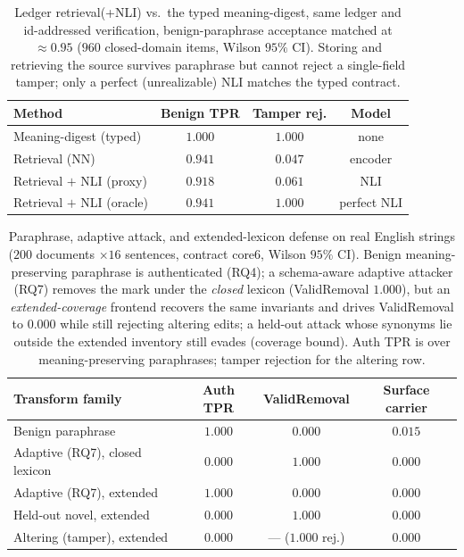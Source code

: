 \documentclass[journal]{IEEEtran}
\begin{document}
\begin{table}[t]
\centering
\caption{Ledger retrieval(+NLI) vs.\ the typed meaning-digest, same ledger and
id-addressed verification, benign-paraphrase acceptance matched at $\approx0.95$
($960$ closed-domain items, Wilson $95\%$ CI). Storing and retrieving the source
survives paraphrase but cannot reject a single-field tamper; only a perfect
(unrealizable) NLI matches the typed contract.}
\label{tab:retrieval}
\footnotesize
\begin{tabular}{lccc}
\toprule
Method & Benign TPR & Tamper rej. & Model \\
\midrule
Meaning-digest (typed)      & $1.000$ & $1.000$ & none \\
Retrieval (NN)              & $0.941$ & $0.047$ & encoder \\
Retrieval $+$ NLI (proxy)   & $0.918$ & $0.061$ & NLI \\
Retrieval $+$ NLI (oracle)  & $0.941$ & $1.000$ & perfect NLI \\
\bottomrule
\end{tabular}
\end{table}

\begin{table}[t]
\centering
\caption{Paraphrase, adaptive attack, and extended-lexicon defense on real
English strings ($200$ documents $\times16$ sentences, contract core6, Wilson
$95\%$ CI). Benign meaning-preserving paraphrase is authenticated (RQ4); a
schema-aware adaptive attacker (RQ7) removes the mark under the \emph{closed}
lexicon (ValidRemoval $1.000$), but an \emph{extended-coverage} frontend recovers
the same invariants and drives ValidRemoval to $0.000$ while still rejecting
altering edits; a held-out attack whose synonyms lie outside the extended
inventory still evades (coverage bound). Auth TPR is over meaning-preserving
paraphrases; tamper rejection for the altering row.}
\label{tab:paraphrase}
\footnotesize
\begin{tabular}{lccc}
\toprule
Transform family & Auth TPR & ValidRemoval & Surface carrier \\
\midrule
Benign paraphrase              & $1.000$ & $0.000$ & $0.015$ \\
Adaptive (RQ7), closed lexicon & $0.000$ & $1.000$ & $0.000$ \\
Adaptive (RQ7), extended       & $1.000$ & $0.000$ & $0.000$ \\
Held-out novel, extended       & $0.000$ & $1.000$ & $0.000$ \\
Altering (tamper), extended    & $0.000$ & --- ($1.000$ rej.) & $0.000$ \\
\bottomrule
\end{tabular}
\end{table}
\end{document}
